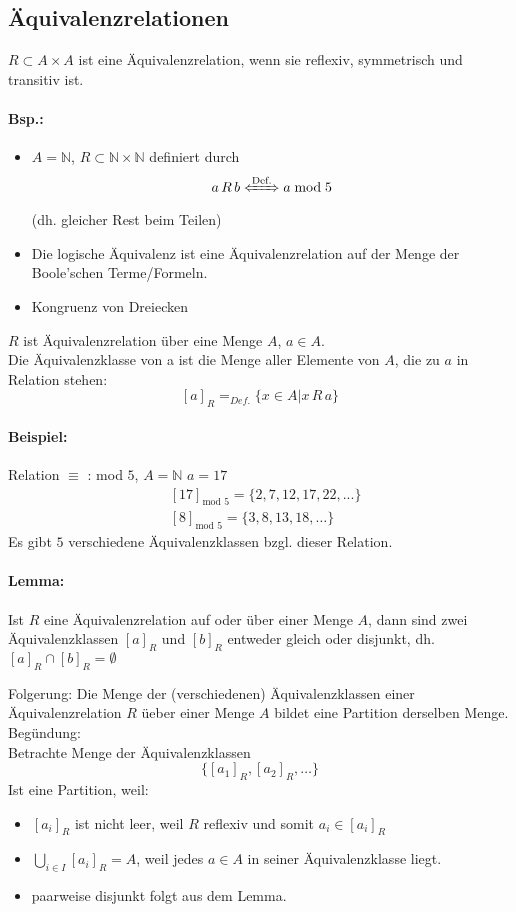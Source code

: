 \subsection{Äquivalenzrelationen}
\begin{defi}[Äquivalenzrelation]
$R\subset A\times A$ ist eine Äquivalenzrelation, wenn sie reflexiv, symmetrisch und transitiv ist.
\end{defi}
%
\paragraph{Bsp.:}
\begin{itemize}
\item $A=\mathbb{N}$, $R\subset\mathbb{N}\times\mathbb{N}$ definiert durch
\[
a\,R\,b \xLeftrightarrow{\text{Def.}} a\bmod 5
\]
(dh. gleicher Rest beim Teilen)
\item Die logische Äquivalenz ist eine Äquivalenzrelation auf der Menge der Boole'schen Terme/Formeln.
\item Kongruenz von Dreiecken
\end{itemize}

\begin{defi}[Äquivalenzklassen]
$R$ ist \"Aquivalenzrelation \"uber eine Menge $A$, $a\in A$.\\
Die \"Aquivalenzklasse von a ist die Menge aller Elemente von $A$, die zu $a$ in Relation stehen:
\[
[a]_{R} =_{Def.} \{x \in A | x\,R\,a\}
\]
\end{defi}
%
\paragraph{Beispiel:}
Relation $\equiv$ : mod $5$, $A = \mathbb{N}$ $a=17$
\begin{align*}
&[17]_{\text{mod }5} = \{2,7,12,17,22,...\} \\
&[8]_{\text{mod }5} = \{3,8,13,18, \ldots\}
\end{align*}
Es gibt $5$ verschiedene \"Aquivalenzklassen bzgl. dieser Relation.

\paragraph{Lemma: } Ist $R$ eine \"Aquivalenzrelation auf oder \"uber einer Menge $A$, dann sind zwei \"Aquivalenzklassen $[a]_R$ und $[b]_R$ entweder gleich oder disjunkt, dh. $[a]_R \cap [b]_R = \emptyset$

Folgerung: Die Menge der (verschiedenen) \"Aquivalenzklassen einer \"Aquivalenzrelation $R$ \"ueber einer Menge $A$ bildet eine Partition derselben Menge.\\
Begündung:\\
Betrachte Menge der \"Aquivalenzklassen
\[
\{[a_1]_R,[a_2]_R,\ldots\}
\]
Ist eine Partition, weil:
\begin{itemize}
\item $[a_i]_R$ ist nicht leer, weil $R$ reflexiv und somit $a_i \in [a_i]_R$
\item $\bigcup_{i \in I} [a_i]_R = A$, weil jedes $a\in A$ in seiner \"Aquivalenzklasse liegt.
\item paarweise disjunkt folgt aus dem Lemma.
\end{itemize}
